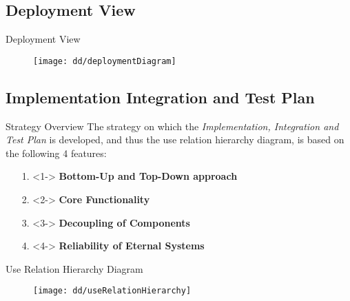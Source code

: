 	\subsection{Deployment View}
		\begin{frame}{Deployment View}
			\begin{figure}[hbtp]
				\vspace{-10pt}
				\centering
				\texttt{[image: dd/deploymentDiagram]}
			\end{figure}
		\end{frame}
	
	\subsection{Implementation Integration and Test Plan}
		\begin{frame}{Strategy Overview}
			\vspace{-2cm}
			The strategy on which the \emph{Implementation, Integration and Test Plan} is developed, and thus the use relation hierarchy diagram, is based on the following 4 features:
			
			\vspace{1cm}
			\begin{itemize}
				\item[1.] <1-> \textbf{Bottom-Up and Top-Down approach}
				\item[2.] <2-> \textbf{Core Functionality}
				\item[3.] <3-> \textbf{Decoupling of Components}
				\item[4.] <4-> \textbf{Reliability of Eternal Systems}
			\end{itemize}
		\end{frame}
	
		\begin{frame}{Use Relation Hierarchy Diagram}
			\begin{figure}
				\vspace{-10pt}
				\centering
				\texttt{[image: dd/useRelationHierarchy]}
			\end{figure}
		\end{frame}